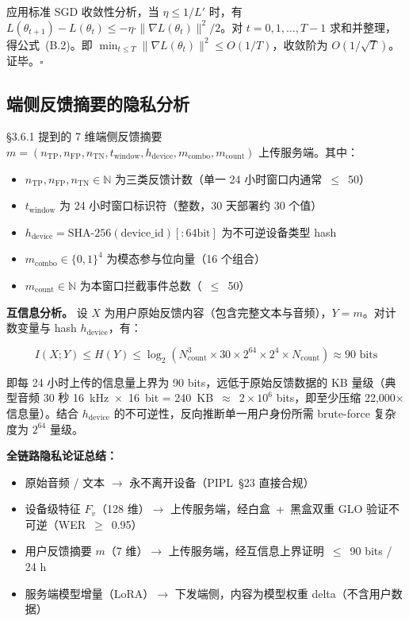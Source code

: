 \documentclass[UTF8,a4paper,10pt,twocolumn]{ctexart}
\theoremstyle{plain}
\newcommand{\N}{\mathbb{N}}
\begin{document}
应用标准 SGD 收敛性分析，当 $\eta \leq 1/L'$ 时，有 $L(\theta_{t+1}) - L(\theta_t) \leq -\eta \cdot \|\nabla L(\theta_t)\|^2 / 2$。对 $t = 0, 1, \dots, T-1$ 求和并整理，得公式~(B.2)。即 $\min_{t \leq T} \|\nabla L(\theta_t)\|^2 \leq O(1/T)$，收敛阶为 $O(1/\sqrt{T})$。证毕。$\square$

\subsection{端侧反馈摘要的隐私分析}

\S3.6.1 提到的 7 维端侧反馈摘要 $m = (n_{\mathrm{TP}}, n_{\mathrm{FP}}, n_{\mathrm{TN}}, t_{\mathrm{window}}, h_{\mathrm{device}}, m_{\mathrm{combo}}, m_{\mathrm{count}})$ 上传服务端。其中：

\begin{itemize}
\item $n_{\mathrm{TP}}, n_{\mathrm{FP}}, n_{\mathrm{TN}} \in \N$ 为三类反馈计数（单一 24 小时窗口内通常~$\leq$~50）
\item $t_{\mathrm{window}}$ 为 24 小时窗口标识符（整数，30 天部署约 30 个值）
\item $h_{\mathrm{device}} = \mathrm{SHA\text{-}256}(\mathrm{device\_id})[:64\mathrm{bit}]$ 为不可逆设备类型 hash
\item $m_{\mathrm{combo}} \in \{0, 1\}^4$ 为模态参与位向量（16 个组合）
\item $m_{\mathrm{count}} \in \N$ 为本窗口拦截事件总数（~$\leq$~50）
\end{itemize}

\textbf{互信息分析。} 设 $X$ 为用户原始反馈内容（包含完整文本与音频），$Y = m$。对计数变量与 hash $h_{\mathrm{device}}$，有：

\begin{equation}\tag{B.3}
I(X; Y) \leq H(Y) \leq \log_2(N_{\mathrm{count}}^3 \times 30 \times 2^{64} \times 2^4 \times N_{\mathrm{count}}) \approx 90 \text{ bits}
\end{equation}

即每 24 小时上传的信息量上界为 90 bits，远低于原始反馈数据的 KB 量级（典型音频 30 秒 16~kHz~$\times$~16~bit = 240~KB~$\approx$~$2 \times 10^6$ bits，即至少压缩 22,000$\times$ 信息量）。结合 $h_{\mathrm{device}}$ 的不可逆性，反向推断单一用户身份所需 brute-force 复杂度为 $2^{64}$ 量级。

\textbf{全链路隐私论证总结：}

\begin{itemize}
\item 原始音频 / 文本 $\to$ 永不离开设备（PIPL~\S23 直接合规）
\item 设备级特征 $F_v$（128 维）$\to$ 上传服务端，经白盒~+~黑盒双重 GLO 验证不可逆（WER~$\geq$~0.95）
\item 用户反馈摘要 $m$（7 维）$\to$ 上传服务端，经互信息上界证明~$\leq$~90 bits / 24 h
\item 服务端模型增量（LoRA）$\to$ 下发端侧，内容为模型权重 delta（不含用户数据）
\end{itemize}
\end{document}
